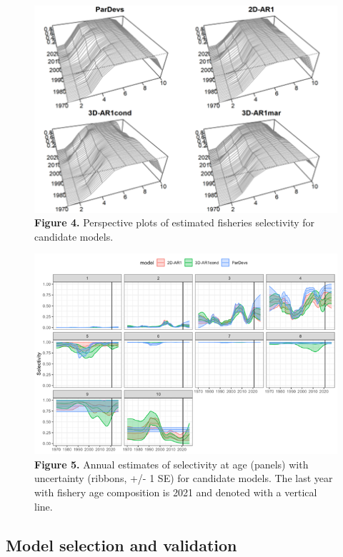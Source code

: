 \documentclass[
]{article}
\begin{document}
\begin{figure}
\hypertarget{fig:figure4}{%
\centering
\includegraphics{Results/Figure4_annual_selectivity.png}
\caption{\textbf{Figure 4.} Perspective plots of estimated fisheries
selectivity for candidate models.}\label{fig:figure4}
}
\end{figure}

\begin{figure}
\hypertarget{fig:figure5}{%
\centering
\includegraphics{Results/Figure5_selectivity_at_age_timeseries.png}
\caption{\textbf{Figure 5.} Annual estimates of selectivity at age
(panels) with uncertainty (ribbons, +/- 1 SE) for candidate models. The
last year with fishery age composition is 2021 and denoted with a
vertical line.}\label{fig:figure5}
}
\end{figure}

\hypertarget{model-selection-and-validation}{%
\subsection{Model selection and
validation}\label{model-selection-and-validation}}
\end{document}
